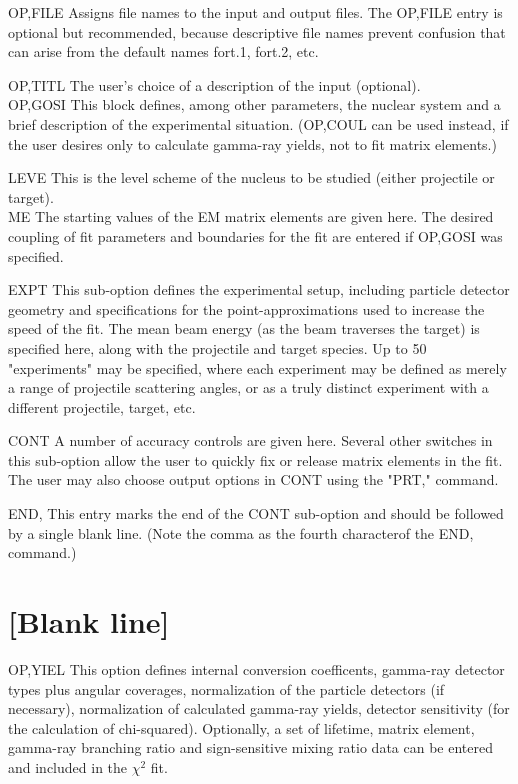 \documentclass[10pt]{article}
\begin{document}
OP,FILE Assigns file names to the input and output files. The OP,FILE entry is optional but recommended, because descriptive file names prevent confusion that can arise from the default names fort.1, fort.2, etc.

OP,TITL The user's choice of a description of the input (optional).\\
OP,GOSI This block defines, among other parameters, the nuclear system and a brief description of the experimental situation. (OP,COUL can be used instead, if the user desires only to calculate gamma-ray yields, not to fit matrix elements.)

LEVE This is the level scheme of the nucleus to be studied (either projectile or target).\\
ME The starting values of the EM matrix elements are given here. The desired coupling of fit parameters and boundaries for the fit are entered if OP,GOSI was specified.

EXPT This sub-option defines the experimental setup, including particle detector geometry and specifications for the point-approximations used to increase the speed of the fit. The mean beam energy (as the beam traverses the target) is specified here, along with the projectile and target species. Up to 50 "experiments" may be specified, where each experiment may be defined as merely a range of projectile scattering angles, or as a truly distinct experiment with a different projectile, target, etc.

CONT A number of accuracy controls are given here. Several other switches in this sub-option allow the user to quickly fix or release matrix elements in the fit. The user may also choose output options in CONT using the "PRT," command.

END, This entry marks the end of the CONT sub-option and should be followed by a single blank line. (Note the comma as the fourth characterof the END, command.)

\section*{[Blank line]}
OP,YIEL This option defines internal conversion coefficents, gamma-ray detector types plus angular coverages, normalization of the particle detectors (if necessary), normalization of calculated gamma-ray yields, detector sensitivity (for the calculation of chi-squared). Optionally, a set of lifetime, matrix element, gamma-ray branching ratio and sign-sensitive mixing ratio data can be entered and included in the $\chi^{2}$ fit.
\end{document}
